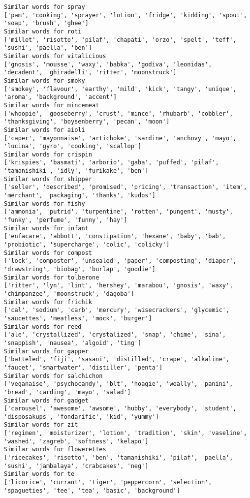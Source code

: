 \documentclass[11pt]{article}
\begin{document}
\begin{Verbatim}[commandchars=\\\{\}]
Similar words for spray
['pam', 'cooking', 'sprayer', 'lotion', 'fridge', 'kidding', 'spout', 'soap', 'brush', 'ghee']
Similar words for roti
['millet', 'risotto', 'pilaf', 'chapati', 'orzo', 'spelt', 'teff', 'sushi', 'paella', 'ben']
Similar words for vitalicious
['gnosis', 'mousse', 'waxy', 'babka', 'godiva', 'leonidas', 'decadent', 'ghiradelli', 'ritter', 'moonstruck']
Similar words for smoky
['smokey', 'flavour', 'earthy', 'mild', 'kick', 'tangy', 'unique', 'aroma', 'background', 'accent']
Similar words for mincemeat
['whoopie', 'gooseberry', 'crust', 'mince', 'rhubarb', 'cobbler', 'thanksgiving', 'boysenberry', 'pecan', 'moon']
Similar words for aioli
['caper', 'mayonnaise', 'artichoke', 'sardine', 'anchovy', 'mayo', 'lucina', 'gyro', 'cooking', 'scallop']
Similar words for crispin
['krispies', 'basmati', 'arborio', 'gaba', 'puffed', 'pilaf', 'tamanishiki', 'idly', 'furikake', 'ben']
Similar words for shipper
['seller', 'described', 'promised', 'pricing', 'transaction', 'item', 'merchant', 'packaging', 'thanks', 'kudos']
Similar words for fishy
['ammonia', 'putrid', 'turpentine', 'rotten', 'pungent', 'musty', 'funky', 'perfume', 'funny', 'hay']
Similar words for infant
['enfacare', 'abbott', 'constipation', 'hexane', 'baby', 'bab', 'probiotic', 'supercharge', 'colic', 'colicky']
Similar words for compost
['lock', 'composter', 'unsealed', 'paper', 'composting', 'diaper', 'drawstring', 'biobag', 'burlap', 'goodie']
Similar words for tolberone
['ritter', 'lyn', 'lint', 'hershey', 'marabou', 'gnosis', 'waxy', 'chimpanzee', 'moonstruck', 'dagoba']
Similar words for frichik
['cal', 'sodium', 'carb', 'mercury', 'wisecrackers', 'glycemic', 'saucettes', 'meatless', 'mock', 'burger']
Similar words for reed
['ale', 'crystallized', 'crystalized', 'snap', 'chime', 'sina', 'snappish', 'nausea', 'algoid', 'ting']
Similar words for gapper
['batteled', 'fiji', 'sasani', 'distilled', 'crape', 'alkaline', 'faucet', 'smartwater', 'distiller', 'penta']
Similar words for salchichon
['veganaise', 'psychocandy', 'blt', 'hoagie', 'weally', 'panini', 'bread', 'carding', 'mayo', 'salad']
Similar words for gadget
['carousel', 'awesome', 'awsome', 'hubby', 'everybody', 'student', 'disposakups', 'fondarific', 'kid', 'yummy']
Similar words for zit
['regimen', 'moisturizer', 'lotion', 'tradition', 'skin', 'vaseline', 'washed', 'zagreb', 'softness', 'kelapo']
Similar words for flowerettes
['ricecakes', 'risotto', 'ben', 'tamanishiki', 'pilaf', 'paella', 'sushi', 'jambalaya', 'crabcakes', 'neg']
Similar words for te
['licorice', 'currant', 'tiger', 'peppercorn', 'selection', 'spagueties', 'tee', 'tea', 'basic', 'background']

\end{Verbatim}
\end{document}
